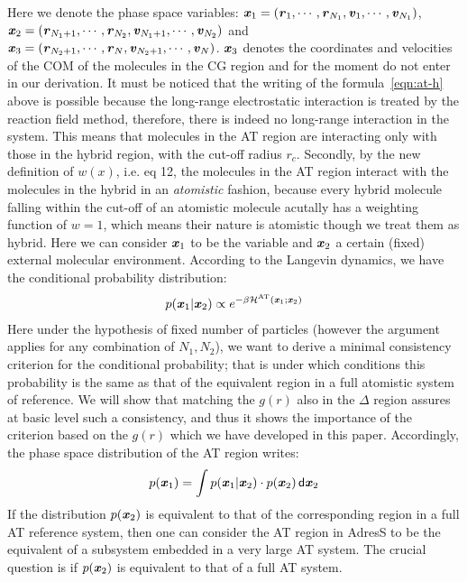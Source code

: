 \documentclass[aps,prb,preprint,citeautoscript]{revtex4}
\newcommand{\redc}[1]{{\color{red} #1}}
\renewcommand{\v}[1]{\textbf{\textit{#1}}}
\renewcommand{\d}[1]{\textsf{#1}}
\begin{document}
Here we denote the phase space variables: $\v x_1 = (\v r_1, \cdots, \v
r_{N_1}, \v v_1, \cdots, \v v_{N_1})$,  $\v x_2 = (\v r_{N_1+1},
\cdots, \v r_{N_2}, \v v_{N_1+1}, \cdots, \v v_{N_2})$ and
$\v x_3 = (\v r_{N_2+1},
\cdots, \v r_{N}, \v v_{N_2+1}, \cdots, \v v_{N})$. $\v x_{3}$ denotes the coordinates and velocities of the COM of the molecules in the CG region and for the moment do not enter in our derivation.
\redc{It must be noticed that the writing of the formula~\eqref{eqn:at-h} above is possible because the long-range electrostatic interaction is treated by the reaction
field method, therefore, there is indeed no long-range interaction in
the system. This means that molecules in the AT region are interacting only with those in the hybrid
region, with the cut-off radius $r_c$. Secondly, by the new
definition of $w(x)$, i.e. eq 12, the molecules in the AT
region interact with the molecules in the hybrid in an 
\emph{atomistic} fashion, because every hybrid molecule falling within the cut-off of
an atomistic molecule acutally has a weighting function of $w=1$,
which means their nature is atomistic though we treat them as hybrid.}
Here we can consider $\v x_1$ to be the variable and $\v x_2$ a certain (fixed) external molecular environment. 
According to the Langevin dynamics, we have the conditional probability distribution:
\begin{align}
  p (\v x_1 \vert \v x_2)  \propto
  e^{-\beta \mathcal H^{\textrm{AT}}(\v x_1; \v x_2)}
\end{align}
\redc{Here under the hypothesis of fixed number of particles (however the argument applies for any combination of $N_{1},N_{2}$), we want to derive a minimal consistency criterion for the conditional probability; that is under which conditions this probability is the same as that of the equivalent region in a full atomistic system of reference. We will show that matching the $g(r)$ also in the $\Delta$ region assures at basic level such a consistency, and thus it shows the importance of the criterion based on the $g(r)$ which we have developed in this paper.}
Accordingly, the phase space distribution of the AT region writes:
\begin{align}
  p(\v x_1) = \int p(\v x_1\vert\v x_2)\cdot p (\v x_2) \,\d d\v x_2
\end{align}
If the distribution $p(\v x_2)$ is equivalent to that of the corresponding region in a full AT reference system, then one can consider the AT region in AdresS to be the equivalent of a subsystem embedded in  a very large AT
system.
The crucial question is if $p(\v x_2)$ is equivalent to that of a full AT system. 
\end{document}
